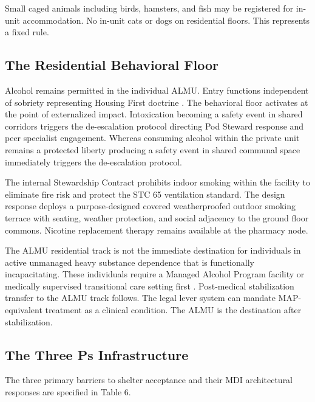 \documentclass[12pt, letterpaper]{article}
\begin{document}
Small caged animals including birds, hamsters, and fish may be registered for in-unit accommodation. No in-unit cats or dogs on residential floors. This represents a fixed rule.

\subsection{The Residential Behavioral Floor}

Alcohol remains permitted in the individual ALMU. Entry functions independent of sobriety representing Housing First doctrine \citep{finland_housing_first_2023}. The behavioral floor activates at the point of externalized impact. Intoxication becoming a safety event in shared corridors triggers the de-escalation protocol directing Pod Steward response and peer specialist engagement. Whereas consuming alcohol within the private unit remains a protected liberty producing a safety event in shared communal space immediately triggers the de-escalation protocol.

The internal Stewardship Contract prohibits indoor smoking within the facility to eliminate fire risk and protect the STC 65 ventilation standard. The design response deploys a purpose-designed covered weatherproofed outdoor smoking terrace with seating, weather protection, and social adjacency to the ground floor commons. Nicotine replacement therapy remains available at the pharmacy node.

The ALMU residential track is not the immediate destination for individuals in active unmanaged heavy substance dependence that is functionally incapacitating. These individuals require a Managed Alcohol Program facility or medically supervised transitional care setting first \citep{ottawa_map_2006, seattle_1811_eastlake_2009}. Post-medical stabilization transfer to the ALMU track follows. The legal lever system can mandate MAP-equivalent treatment as a clinical condition. The ALMU is the destination after stabilization.

\subsection{The Three Ps Infrastructure}

The three primary barriers to shelter acceptance and their MDI architectural responses are specified in Table 6.
\end{document}
